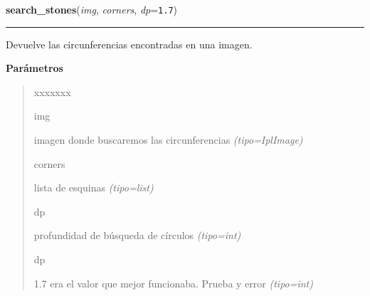 \hspace{.8\funcindent}\begin{boxedminipage}{\funcwidth}

    \raggedright \textbf{search\_stones}(\textit{img}, \textit{corners}, \textit{dp}={\tt 1.7})

    \vspace{-1.5ex}

    \rule{\textwidth}{0.5\fboxrule}
\setlength{\parskip}{2ex}
Devuelve las circunferencias encontradas en una imagen.

\setlength{\parskip}{1ex}
      \textbf{Parámetros}
      \vspace{-1ex}

      \begin{quote}
        \begin{Ventry}{xxxxxxx}

          \item[img]


imagen donde buscaremos las circunferencias
            {\it (tipo=IplImage)}

          \item[corners]


lista de esquinas
            {\it (tipo=list)}

          \item[dp]


profundidad de búsqueda de círculos
            {\it (tipo=int)}

          \item[dp]


1.7 era el valor que mejor funcionaba. Prueba y error
            {\it (tipo=int)}

        \end{Ventry}

      \end{quote}

    \end{boxedminipage}

    \label{src:search_stones:check_color_stone}

    \vspace{0.5ex}

